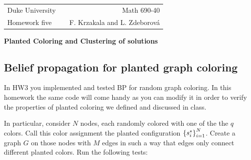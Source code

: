 \documentclass[a4paper,oneside,12pt]{article}
\begin{document}
\noindent

\begin{tabular}{lcr}
  Duke University & & Math 690-40 \\  
  Homework five & \hspace{6.3cm} & F. Krzakala and L. Zdeborov\'a\\ \hline
\end{tabular}

\begin{center}
  {\Large {\bf Planted Coloring and Clustering of solutions}}
\end{center}


\subsection*{Belief propagation for planted graph coloring}

In HW3 you implemented and tested BP for random graph coloring. 
In this homework the same code will come handy as you can modify it in order to verify the properties of planted coloring we defined and discussed in class. 

In particular, consider $ N $ nodes, each randomly colored with one of the the $ q $ colors. 
Call this color assignment the planted configuration $ \left\lbrace  s_i^*  \right\rbrace_{i=1}^N $. 
Create a graph $ G $ on those nodes with $ M $ edges in such a way that edges only connect different planted colors. 
Run the following tests:
\end{document}
